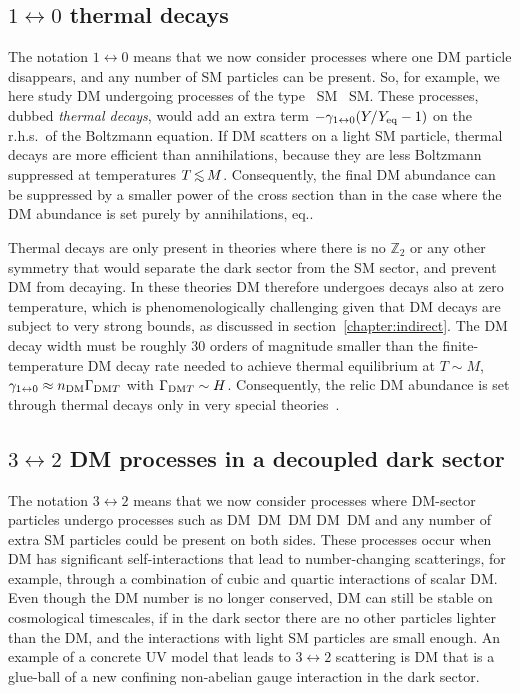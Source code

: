 \subsection{$1\leftrightarrow 0$ thermal decays}
The notation $1\leftrightarrow 0$ means that we now consider processes where one DM particle
disappears, and any number of SM particles can be present.
So, for example, we here study  DM undergoing processes of the type
\,  {\rm SM} \, {\rm SM}.\eeq
These processes, dubbed {\em thermal decays}, would add an extra term
$ -\gamma_{1\leftrightarrow 0}   (Y/Y_{\rm eq}-1)$
 on the r.h.s.~of the Boltzmann equation. 
If DM scatters on a light SM particle, thermal decays are
more efficient than annihilations, because they are less Boltzmann suppressed at temperatures $T \circa{<}M$. Consequently, 
the  final DM abundance  can be suppressed by a smaller power of the cross section
than in the case where the DM abundance is set purely by annihilations, eq..

\smallskip

Thermal decays are only present in theories where there is no $\mathbb{Z}_2$ or any other symmetry that would
separate the dark sector from the SM sector, and prevent DM from decaying.
In these theories DM therefore undergoes decays also at zero temperature, which is phenomenologically challenging given that DM decays are
subject to very strong bounds, as discussed in section~\ref{chapter:indirect}.
The DM decay width must be roughly 30 orders of magnitude smaller than
the finite-temperature DM decay rate needed to achieve thermal equilibrium at $T\sim M$,
 $\gamma_{1\leftrightarrow 0} \approx n_{\rm DM} \Gamma_{{\rm DM}T}$ with $\Gamma_{{\rm DM}T}\sim H$.
Consequently, the relic DM abundance is set through thermal decays 
only in very special theories~\cite{Thermaldecays}.

\subsection{$3\leftrightarrow 2$ DM processes in a decoupled dark sector}\label{cannibalism}
\label{DM cosmological abundance!cannibalism}
The notation $3\leftrightarrow 2$ means that we now consider processes
where DM-sector particles undergo processes such as
\beq \hbox{DM DM DM} \leftrightarrow \hbox{DM DM}\eeq
and any number of extra SM particles could be present on both sides.
These processes occur when DM has significant self-interactions
 that lead to number-changing scatterings,
 for example, through a combination of cubic and quartic interactions of scalar DM.
Even though the DM number is no longer conserved,
DM can still be stable on cosmological timescales, if in the dark sector there are no other particles lighter than the DM,
and the interactions with light SM particles are small enough.
An example of a concrete UV model that leads to $3\leftrightarrow 2$ scattering is DM that is a glue-ball of a new confining non-abelian gauge interaction in the dark sector.

